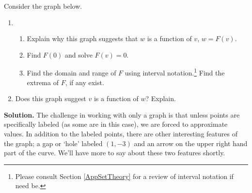 \documentclass{ximera}
\begin{document}
\begin{example}  \label{functiongraphex01} Consider the graph below.  




\begin{enumerate}

\item \begin{enumerate} 

\item Explain why this graph suggests that $w$ is a function of $v$, $w = F(v)$.

\item  Find  $F(0)$ and solve $F(v) = 0$.

\item  Find the domain and range of $F$ using interval notation.\footnote{Please consult  Section \ref{AppSetTheory} for a review of interval notation if need be.}   Find the extrema of $F$, if any exist.

\end{enumerate}

\item  Does this graph suggest $v$ is a function of $w$?  Explain.

\end{enumerate}

{\bf Solution.}  The challenge in working with only a graph is that unless points are specifically labeled (as some are in this case), we are forced to approximate values. In addition to the labeled points, there are other interesting features of the graph;  a gap or `hole' labeled $(1,-3)$ and an arrow on the upper right hand part of the curve.  We'll have more to say about these two features shortly.  



\end{example}
\end{document}
